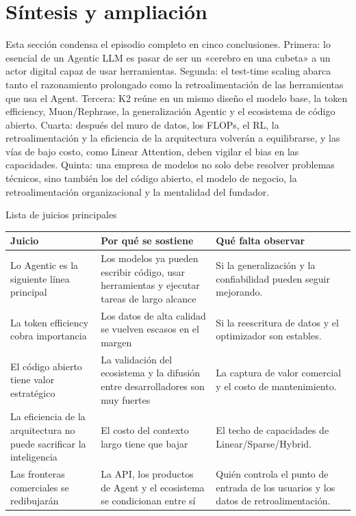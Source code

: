\section{Síntesis y ampliación}

Esta sección condensa el episodio completo en cinco conclusiones. Primera: lo esencial de un Agentic LLM es pasar de ser un «cerebro en una cubeta» a un actor digital capaz de usar herramientas. Segunda: el test-time scaling abarca tanto el razonamiento prolongado como la retroalimentación de las herramientas que usa el Agent. Tercera: K2 reúne en un mismo diseño el modelo base, la token efficiency, Muon/Rephrase, la generalización Agentic y el ecosistema de código abierto. Cuarta: después del muro de datos, los FLOPs, el RL, la retroalimentación y la eficiencia de la arquitectura volverán a equilibrarse, y las vías de bajo costo, como Linear Attention, deben vigilar el bias en las capacidades. Quinta: una empresa de modelos no solo debe resolver problemas técnicos, sino también los del código abierto, el modelo de negocio, la retroalimentación organizacional y la mentalidad del fundador.

\begin{knowledgebox}{Lista de juicios principales}
\begin{tabularx}{\textwidth}{p{}p{}X}
\toprule
Juicio & Por qué se sostiene & Qué falta observar \\
\midrule
Lo Agentic es la siguiente línea principal & Los modelos ya pueden escribir código, usar herramientas y ejecutar tareas de largo alcance & Si la generalización y la confiabilidad pueden seguir mejorando. \\
La token efficiency cobra importancia & Los datos de alta calidad se vuelven escasos en el margen & Si la reescritura de datos y el optimizador son estables. \\
El código abierto tiene valor estratégico & La validación del ecosistema y la difusión entre desarrolladores son muy fuertes & La captura de valor comercial y el costo de mantenimiento. \\
La eficiencia de la arquitectura no puede sacrificar la inteligencia & El costo del contexto largo tiene que bajar & El techo de capacidades de Linear/Sparse/Hybrid. \\
Las fronteras comerciales se redibujarán & La API, los productos de Agent y el ecosistema se condicionan entre sí & Quién controla el punto de entrada de los usuarios y los datos de retroalimentación. \\
\bottomrule
\end{tabularx}
\end{knowledgebox}

